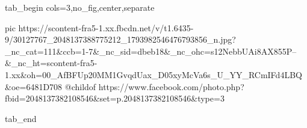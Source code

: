  
 
 
 
 


\ifcmt
  tab_begin cols=3,no_fig,center,separate

     pic https://scontent-fra5-1.xx.fbcdn.net/v/t1.6435-9/30127767_2048137388775212_1793982546476793856_n.jpg?_nc_cat=111&ccb=1-7&_nc_sid=dbeb18&_nc_ohc=s12NebbUAi8AX855P--&_nc_ht=scontent-fra5-1.xx&oh=00_AfBFUp20MM1GvqdUax_D05xyMcVa6s_U_YY_RCmIFd4LBQ&oe=6481D708
		 @childof https://www.facebook.com/photo.php?fbid=2048137382108546&set=p.2048137382108546&type=3

  tab_end
\fi
